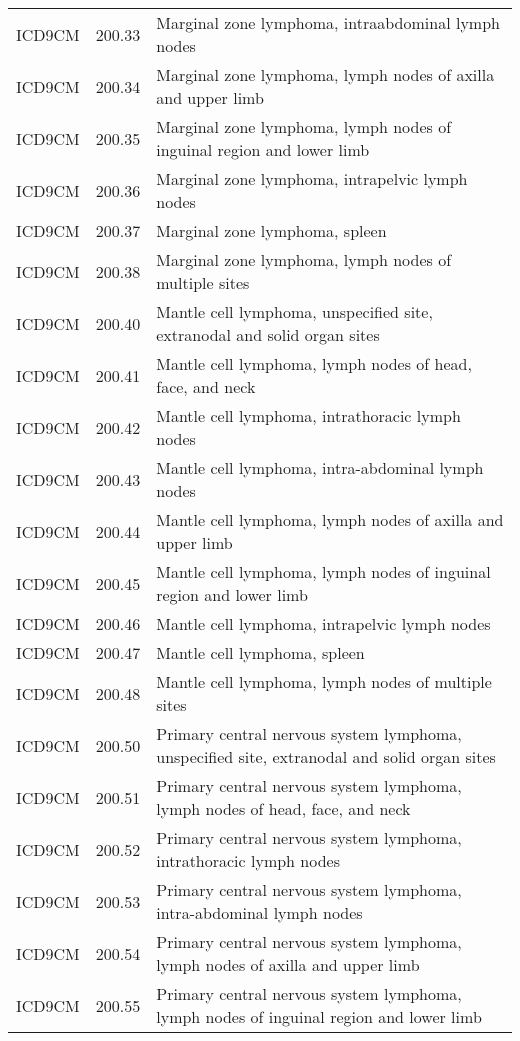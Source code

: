 \begin{longtable}{p{}p{}p{}}
  ICD9CM & 200.33 & Marginal zone lymphoma, intraabdominal lymph nodes \\ 
  ICD9CM & 200.34 & Marginal zone lymphoma, lymph nodes of axilla and upper limb \\ 
  ICD9CM & 200.35 & Marginal zone lymphoma, lymph nodes of inguinal region and lower limb \\ 
  ICD9CM & 200.36 & Marginal zone lymphoma, intrapelvic lymph nodes \\ 
  ICD9CM & 200.37 & Marginal zone lymphoma, spleen \\ 
  ICD9CM & 200.38 & Marginal zone lymphoma, lymph nodes of multiple sites \\ 
  ICD9CM & 200.40 & Mantle cell lymphoma, unspecified site, extranodal and solid organ sites \\ 
  ICD9CM & 200.41 & Mantle cell lymphoma, lymph nodes of head, face, and neck \\ 
  ICD9CM & 200.42 & Mantle cell lymphoma, intrathoracic lymph nodes \\ 
  ICD9CM & 200.43 & Mantle cell lymphoma, intra-abdominal lymph nodes \\ 
  ICD9CM & 200.44 & Mantle cell lymphoma, lymph nodes of axilla and upper limb \\ 
  ICD9CM & 200.45 & Mantle cell lymphoma, lymph nodes of inguinal region and lower limb \\ 
  ICD9CM & 200.46 & Mantle cell lymphoma, intrapelvic lymph nodes \\ 
  ICD9CM & 200.47 & Mantle cell lymphoma, spleen \\ 
  ICD9CM & 200.48 & Mantle cell lymphoma, lymph nodes of multiple sites \\ 
  ICD9CM & 200.50 & Primary central nervous system lymphoma, unspecified site, extranodal and solid organ sites \\ 
  ICD9CM & 200.51 & Primary central nervous system lymphoma, lymph nodes of head, face, and neck \\ 
  ICD9CM & 200.52 & Primary central nervous system lymphoma, intrathoracic lymph nodes \\ 
  ICD9CM & 200.53 & Primary central nervous system lymphoma, intra-abdominal lymph nodes \\ 
  ICD9CM & 200.54 & Primary central nervous system lymphoma, lymph nodes of axilla and upper limb \\ 
  ICD9CM & 200.55 & Primary central nervous system lymphoma, lymph nodes of inguinal region and lower limb \\ 

\end{longtable}
